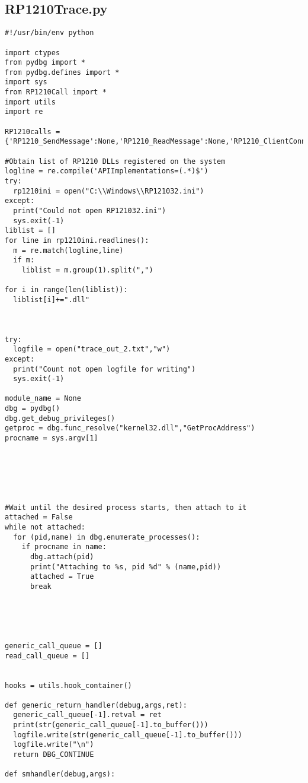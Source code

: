 \begin{appendices}
\subsection{RP1210Trace.py}\label{app:trace}
\begin{verbatim}
#!/usr/bin/env python

import ctypes
from pydbg import *
from pydbg.defines import *
import sys
from RP1210Call import *
import utils
import re

RP1210calls = {'RP1210_SendMessage':None,'RP1210_ReadMessage':None,'RP1210_ClientConnect':None,'RP1210_ClientDisconnect':None,'RP1210_SendCommand':None}

#Obtain list of RP1210 DLLs registered on the system
logline = re.compile('APIImplementations=(.*)$')
try:
  rp1210ini = open("C:\\Windows\\RP121032.ini")
except:
  print("Could not open RP121032.ini")
  sys.exit(-1)
liblist = []
for line in rp1210ini.readlines():
  m = re.match(logline,line)
  if m:
    liblist = m.group(1).split(",")

for i in range(len(liblist)):
  liblist[i]+=".dll"



try:
  logfile = open("trace_out_2.txt","w")
except:
  print("Count not open logfile for writing")
  sys.exit(-1)

module_name = None
dbg = pydbg()
dbg.get_debug_privileges()
getproc = dbg.func_resolve("kernel32.dll","GetProcAddress")
procname = sys.argv[1]






#Wait until the desired process starts, then attach to it
attached = False
while not attached:
  for (pid,name) in dbg.enumerate_processes():
    if procname in name:
      dbg.attach(pid)
      print("Attaching to %s, pid %d" % (name,pid))
      attached = True
      break





generic_call_queue = []
read_call_queue = []


hooks = utils.hook_container()

def generic_return_handler(debug,args,ret):
  generic_call_queue[-1].retval = ret
  print(str(generic_call_queue[-1].to_buffer()))
  logfile.write(str(generic_call_queue[-1].to_buffer()))
  logfile.write("\n")
  return DBG_CONTINUE

def smhandler(debug,args):


\end{verbatim}
\end{appendices}
